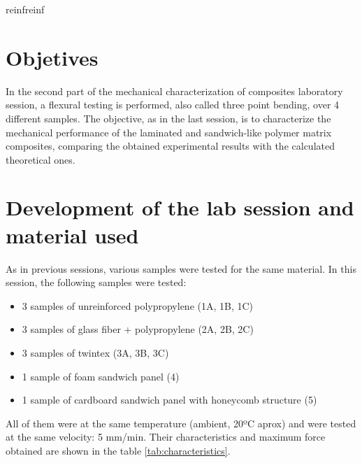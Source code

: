 reinfreinf\section{Objetives}
In the second part of the mechanical characterization of composites laboratory
session, a flexural testing is performed, also called three point bending, over
4 different samples. The objective, as in the last session, is to characterize
the mechanical performance of the laminated and sandwich-like polymer matrix
composites, comparing the obtained experimental results with the calculated
theoretical ones.

\section{Development of the lab session and material used}
As in previous sessions, various samples were tested for the same material. In this session, the following samples were tested:
\begin{itemize}
	\item 3 samples of unreinforced polypropylene (1A, 1B, 1C)
	\item 3 samples of glass fiber + polypropylene (2A, 2B, 2C)
	\item 3 samples of twintex (3A, 3B, 3C)
	\item 1 sample of foam sandwich panel  (4)
	\item 1 sample of cardboard sandwich panel with honeycomb structure (5)
\end{itemize}

All of them were at the same temperature (ambient, 20ºC aprox)
and were tested at the same velocity: 5 mm/min. Their characteristics and maximum
force obtained are shown in the table \ref{tab:characteristics}.

